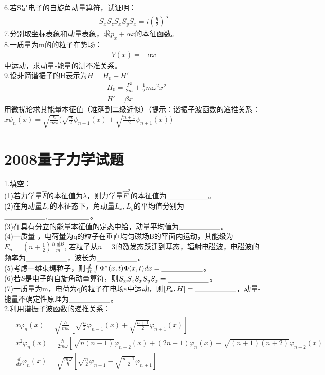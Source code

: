 \documentclass[UTF8]{article}
\numberwithin{equation}{section}
\begin{document}
6.若S是电子的自旋角动量算符，试证明：
\begin{align*}
    S_xS_zS_xS_yS_x=i(\frac{\hbar}{2})^5
\end{align*}
7.分别取坐标表象和动量表象，求$p_x+\alpha x$的本征函数。\\[10pt]
8.一质量为m的的粒子在势场：
\begin{align*}
    V(x)=-\alpha x
\end{align*}
中运动，求动量-能量的测不准关系。\\[10pt]
9.设非简谐振子的H表示为$H=H_0+H'$
\begin{align*}
    &H_0=\frac{P^2}{2m}+\frac{1}{2}m\omega^2 x^2\\
    &H'=\beta x
\end{align*}
用微扰论求其能量本征值（准确到二级近似）（提示：谐振子波函数的递推关系：\\
$x\psi_n(x)=\sqrt{\frac{\hbar}{m\omega}}(\sqrt{\frac{n}{2}}\psi_{n-1}(x)+\sqrt{\frac{n+1}{2}\psi_{n+1}(x)}$)
\newpage
{\centering\section{2008量子力学试题}}
\noindent
1.填空：\\
(1)若力学量$\hat{F}$的本征值为$\lambda$，则力学量$\hat{F}^2$的本征值为$\underline{\hbox to 20mm{}}$。\\
(2)在角动量$L_z$的本征态下，角动量$L_x,L_y$的平均值分别为$\underline{\hbox to 20mm{}},\underline{\hbox to 20mm{}}$。\\
(3)在具有分立的能量本征值的定态中给，动量平均值为$\underline{\hbox to 20mm{}}$。\\
(4)一质量 ，电荷量为q的粒子在垂直均匀磁场B的平面内运动，其能级为$E_n=(n+\frac{1}{2})\frac{\hbar |q| B}{m}$,
若粒子从$n=3$的激发态跃迁到基态，辐射电磁波，电磁波的频率为$\underline{\hbox to 20mm{}}$，波长为$\underline{\hbox to 20mm{}}$。\\
(5)考虑一维束缚粒子，则$\frac{d}{dt}\int \Phi^*(x,t)\Phi(x,t)dx=\underline{\hbox to 20mm{}}$。\\
(6)若$S$是电子的自旋角动量算符，则$S_xS_zS_xS_yS_x=\underline{\hbox to 20mm{}}$。\\
(7)一质量为m，电荷为q的粒子在电场$\varepsilon$中运动，则$[P_x,H]=\underline{\hbox to 20mm{}}$，动量-能量不确定性原理为$\underline{\hbox to 20mm{}}$。\\[10pt]
2.利用谐振子波函数的递推关系：
\begin{align*}
    \begin{aligned}
    &x \varphi_n(x)=\sqrt{\frac{\hbar}{m \omega}}\left[\sqrt{\frac{n}{2}} \varphi_{n-1}(x)+\sqrt{\frac{n+1}{2}} \varphi_{n+1}(x)\right] \\
    &x^2 \varphi_n(x)=\frac{\hbar}{2 m \omega}\left[\sqrt{n(n-1)} \varphi_{n-2}(x)+(2 n+1) \varphi_n(x)+\sqrt{(n+1)(n+2)} \varphi_{n+2}(x)\right. \\
    &\frac{d}{d x} \varphi_n(x)=\sqrt{\frac{m \omega}{\hbar}}\left[\sqrt{\frac{n}{2}} \varphi_{n-1}-\sqrt{\frac{n+1}{2}} \varphi_{n+1}\right]
    \end{aligned}
\end{align*}
\end{document}
